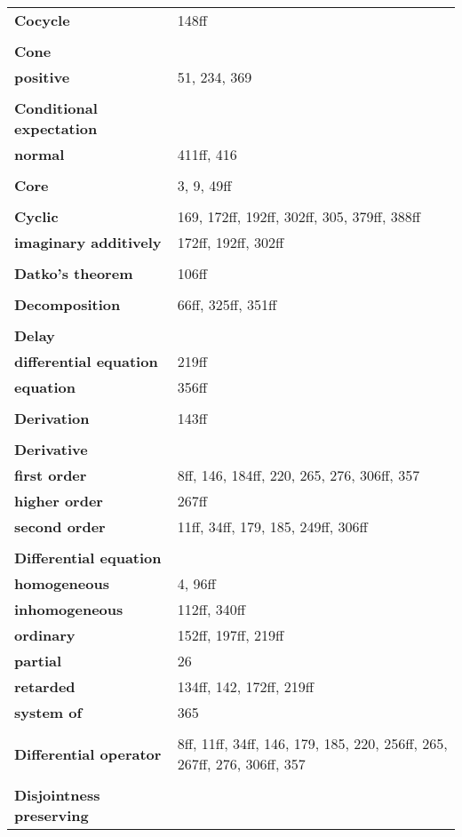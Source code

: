 \documentclass[10pt]{scrartcl}
\begin{document}
\begin{longtable}{>{\bfseries}p{6cm}p{8cm}}
\textbf{Cocycle} & 148ff \\
\\
\textbf{Cone} & \\
\quad positive & 51, 234, 369 \\
\\
\textbf{Conditional expectation} & \\
\quad normal & 411ff, 416 \\
\\
\textbf{Core} & 3, 9, 49ff \\
\\
\textbf{Cyclic} & 169, 172ff, 192ff, 302ff, 305, 379ff, 388ff \\
\quad imaginary additively & 172ff, 192ff, 302ff \\
\\
\textbf{Datko's theorem} & 106ff \\
\\
\textbf{Decomposition} & 66ff, 325ff, 351ff \\
\\
\textbf{Delay} & \\
\quad differential equation & 219ff \\
\quad equation & 356ff \\
\\
\textbf{Derivation} & 143ff \\
\\
\textbf{Derivative} & \\
\quad first order & 8ff, 146, 184ff, 220, 265, 276, 306ff, 357 \\
\quad higher order & 267ff \\
\quad second order & 11ff, 34ff, 179, 185, 249ff, 306ff \\
\\
\textbf{Differential equation} & \\
\quad homogeneous & 4, 96ff \\
\quad inhomogeneous & 112ff, 340ff \\
\quad ordinary & 152ff, 197ff, 219ff \\
\quad partial & 26 \\
\quad retarded & 134ff, 142, 172ff, 219ff \\
\quad system of & 365 \\
\\
\textbf{Differential operator} & 8ff, 11ff, 34ff, 146, 179, 185, 220, 256ff, 265, 267ff, 276, 306ff, 357 \\
\\
\textbf{Disjointness preserving} & \\

\end{longtable}
\end{document}
